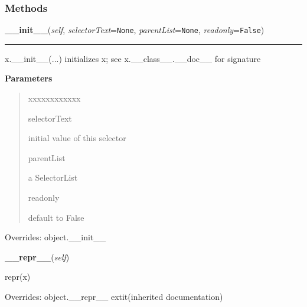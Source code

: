 
  \subsubsection{Methods}

    \vspace{0.5ex}

\hspace{.8\funcindent}\begin{boxedminipage}{\funcwidth}

    \raggedright \textbf{\_\_init\_\_}(\textit{self}, \textit{selectorText}={\tt None}, \textit{parentList}={\tt None}, \textit{readonly}={\tt False})

    \vspace{-1.5ex}

    \rule{\textwidth}{0.5\fboxrule}
\setlength{\parskip}{2ex}
    x.\_\_init\_\_(...) initializes x; see x.\_\_class\_\_.\_\_doc\_\_ for 
    signature

\setlength{\parskip}{1ex}
      \textbf{Parameters}
      \vspace{-1ex}

      \begin{quote}
        \begin{Ventry}{xxxxxxxxxxxx}

          \item[selectorText]


initial value of this selector
          \item[parentList]


a SelectorList
          \item[readonly]


default to False
        \end{Ventry}

      \end{quote}

      Overrides: object.\_\_init\_\_

    \end{boxedminipage}

    \vspace{0.5ex}

\hspace{.8\funcindent}\begin{boxedminipage}{\funcwidth}

    \raggedright \textbf{\_\_repr\_\_}(\textit{self})

\setlength{\parskip}{2ex}
    repr(x)

\setlength{\parskip}{1ex}
      Overrides: object.\_\_repr\_\_ 	extit{(inherited documentation)}

    \end{boxedminipage}

